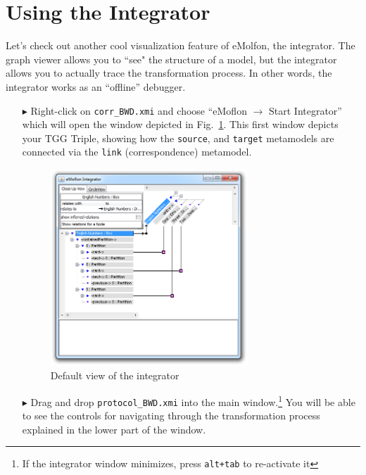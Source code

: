 \newpage
\section{Using the Integrator}
\genHeader
\label{sec:app_integrator}

Let's check out another cool visualization feature of eMolfon, the integrator. The graph viewer allows you to ``see" the structure of a model, but the
integrator allows you to actually trace the transformation process. In other words, the integrator works as an ``offline'' debugger.

\begin{itemize}

\item[$\blacktriangleright$] Right-click on \texttt{corr\_BWD.xmi} and choose ``eMoflon $\rightarrow$ Start Integrator'' which will open the window depicted in
Fig.~\ref{fig:integrator_start}. This first window depicts your TGG Triple, showing how the \texttt{source}, and \texttt{target} metamodels are connected via
the \texttt{link} (correspondence) metamodel.

\begin{figure}[htbp]
\begin{center}
  \includegraphics[width=0.7\textwidth]{eclipse_integratorStart}
  \caption{Default view of the integrator}
  \label{fig:integrator_start}
\end{center}
\end{figure}

\item[$\blacktriangleright$] Drag and drop \texttt{protocol\_BWD.xmi} into the main window.\footnote{If the integrator window minimizes, press \texttt{alt+tab}
to re-activate it} You will be able to see the controls for navigating through the transformation process explained in the lower part of the window.


\end{itemize}
